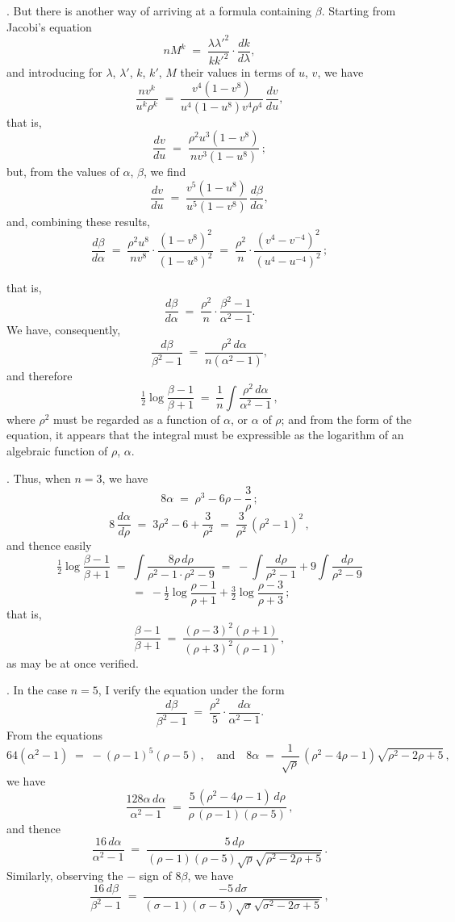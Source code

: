 \documentclass[11pt]{article}
\begin{document}
\medskip

. But there is another way of arriving at a formula containing $\beta$. Starting from Jacobi's equation
\[
n M^k \;=\; \frac{\lambda \lambda'^2}{k k'^2}\cdot\frac{d k}{d\lambda},
\]
and introducing for $\lambda$, $\lambda'$, $k$, $k'$, $M$ their values in terms of $u$, $v$, we have
\[
\frac{n v^k}{u^k\rho^k} \;=\; \frac{v^4 (1 - v^8)}{u^4 (1 - u^8) v^4 \rho^4}\,\frac{d v}{d u},
\]
that is,
\[
\frac{d v}{d u} \;=\; \frac{\rho^2 u^3 (1 - v^8)}{n v^3 (1 - u^8)}\,;
\]
but, from the values of $\alpha$, $\beta$, we find
\[
\frac{d v}{d u} \;=\; \frac{v^5 (1 - u^8)}{u^5 (1 - v^8)}\,\frac{d\beta}{d\alpha},
\]
and, combining these results,
\[
\frac{d\beta}{d\alpha} \;=\; \frac{\rho^2 u^8}{n v^8}\cdot\frac{(1 - v^8)^2}{(1 - u^8)^2} \;=\; \frac{\rho^2}{n}\cdot\frac{(v^4 - v^{-4})^2}{(u^4 - u^{-4})^2}\,;
\]

\newpage

\noindent that is,
\[
\frac{d\beta}{d\alpha} \;=\; \frac{\rho^2}{n}\cdot\frac{\beta^2 - 1}{\alpha^2 - 1}.
\]
We have, consequently,
\[
\frac{d\beta}{\beta^2 - 1} \;=\; \frac{\rho^2\,d\alpha}{n(\alpha^2 - 1)},
\]
and therefore
\[
\tfrac{1}{2}\log\frac{\beta - 1}{\beta + 1} \;=\; \frac{1}{n}\int\frac{\rho^2\,d\alpha}{\alpha^2 - 1}\,,
\]
where $\rho^2$ must be regarded as a function of $\alpha$, or $\alpha$ of $\rho$; and from the form of the equation, it appears that the integral must be expressible as the logarithm of an algebraic function of $\rho$, $\alpha$.

\medskip

. Thus, when $n=3$, we have
\[
8\alpha \;=\; \rho^3 - 6\rho - \frac{3}{\rho}\,;
\]
\[
8\,\frac{d\alpha}{d\rho} \;=\; 3\rho^2 - 6 + \frac{3}{\rho^2} \;=\; \frac{3}{\rho^2}\,(\rho^2 - 1)^2\,,
\]
and thence easily
\[
\tfrac{1}{2}\log\frac{\beta - 1}{\beta + 1} \;=\; \int\frac{8\rho\,d\rho}{\rho^2 - 1\cdot\rho^2 - 9} \;=\; -\int\frac{d\rho}{\rho^2 - 1} + 9\int\frac{d\rho}{\rho^2 - 9}
\]
\[
\;=\; -\tfrac{1}{2}\log\frac{\rho - 1}{\rho + 1} + \tfrac{3}{2}\log\frac{\rho - 3}{\rho + 3}\,;
\]
that is,
\[
\frac{\beta - 1}{\beta + 1} \;=\; \frac{(\rho - 3)^2(\rho + 1)}{(\rho + 3)^2(\rho - 1)}\,,
\]
as may be at once verified.

\medskip

. In the case $n=5$, I verify the equation under the form
\[
\frac{d\beta}{\beta^2 - 1} \;=\; \frac{\rho^2}{5}\cdot\frac{d\alpha}{\alpha^2 - 1}.
\]
From the equations
\[
64(\alpha^2 - 1) \;=\; -(\rho - 1)^5(\rho - 5)\,,\quad\text{and}\quad 8\alpha \;=\; \frac{1}{\sqrt{\rho}}\,(\rho^2 - 4\rho - 1)\sqrt{\rho^2 - 2\rho + 5}\,,
\]
we have
\[
\frac{128\alpha\,d\alpha}{\alpha^2 - 1} \;=\; \frac{5\,(\rho^2 - 4\rho - 1)\,d\rho}{\rho\,(\rho - 1)(\rho - 5)}\,,
\]
and thence
\[
\frac{16\,d\alpha}{\alpha^2 - 1} \;=\; \frac{5\,d\rho}{(\rho - 1)(\rho - 5)\sqrt{\rho}\sqrt{\rho^2 - 2\rho + 5}}\,.
\]
Similarly, observing the $-$ sign of $8\beta$, we have
\[
\frac{16\,d\beta}{\beta^2 - 1} \;=\; \frac{-5\,d\sigma}{(\sigma - 1)(\sigma - 5)\sqrt{\sigma}\sqrt{\sigma^2 - 2\sigma + 5}}\,,
\]
\end{document}
